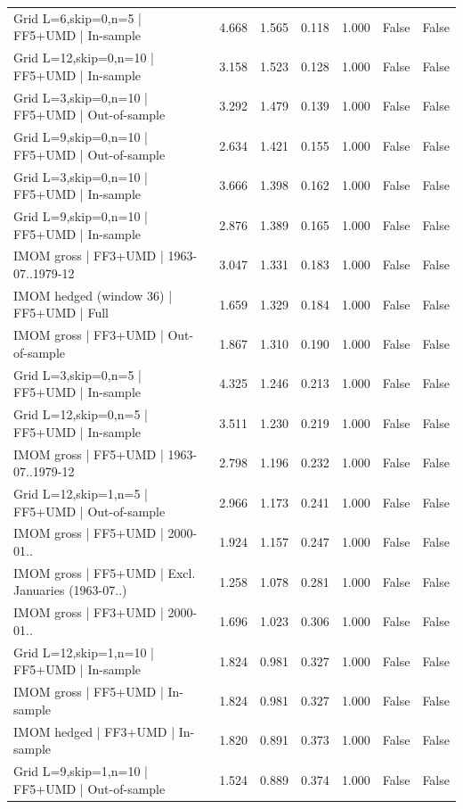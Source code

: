 \begin{tabular}{lrrrrrr}
Grid L=6,skip=0,n=5 | FF5+UMD | In-sample & 4.668 & 1.565 & 0.118 & 1.000 & False & False \\
Grid L=12,skip=0,n=10 | FF5+UMD | In-sample & 3.158 & 1.523 & 0.128 & 1.000 & False & False \\
Grid L=3,skip=0,n=10 | FF5+UMD | Out-of-sample & 3.292 & 1.479 & 0.139 & 1.000 & False & False \\
Grid L=9,skip=0,n=10 | FF5+UMD | Out-of-sample & 2.634 & 1.421 & 0.155 & 1.000 & False & False \\
Grid L=3,skip=0,n=10 | FF5+UMD | In-sample & 3.666 & 1.398 & 0.162 & 1.000 & False & False \\
Grid L=9,skip=0,n=10 | FF5+UMD | In-sample & 2.876 & 1.389 & 0.165 & 1.000 & False & False \\
IMOM gross | FF3+UMD | 1963-07..1979-12 & 3.047 & 1.331 & 0.183 & 1.000 & False & False \\
IMOM hedged (window 36) | FF5+UMD | Full & 1.659 & 1.329 & 0.184 & 1.000 & False & False \\
IMOM gross | FF3+UMD | Out-of-sample & 1.867 & 1.310 & 0.190 & 1.000 & False & False \\
Grid L=3,skip=0,n=5 | FF5+UMD | In-sample & 4.325 & 1.246 & 0.213 & 1.000 & False & False \\
Grid L=12,skip=0,n=5 | FF5+UMD | In-sample & 3.511 & 1.230 & 0.219 & 1.000 & False & False \\
IMOM gross | FF5+UMD | 1963-07..1979-12 & 2.798 & 1.196 & 0.232 & 1.000 & False & False \\
Grid L=12,skip=1,n=5 | FF5+UMD | Out-of-sample & 2.966 & 1.173 & 0.241 & 1.000 & False & False \\
IMOM gross | FF5+UMD | 2000-01.. & 1.924 & 1.157 & 0.247 & 1.000 & False & False \\
IMOM gross | FF5+UMD | Excl. Januaries (1963-07..) & 1.258 & 1.078 & 0.281 & 1.000 & False & False \\
IMOM gross | FF3+UMD | 2000-01.. & 1.696 & 1.023 & 0.306 & 1.000 & False & False \\
Grid L=12,skip=1,n=10 | FF5+UMD | In-sample & 1.824 & 0.981 & 0.327 & 1.000 & False & False \\
IMOM gross | FF5+UMD | In-sample & 1.824 & 0.981 & 0.327 & 1.000 & False & False \\
IMOM hedged | FF3+UMD | In-sample & 1.820 & 0.891 & 0.373 & 1.000 & False & False \\
Grid L=9,skip=1,n=10 | FF5+UMD | Out-of-sample & 1.524 & 0.889 & 0.374 & 1.000 & False & False \\

\end{tabular}
